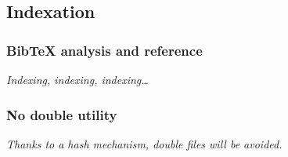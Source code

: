 \subsection{Indexation}

\subsubsection{Bib\TeX{} analysis and reference}

\textit{Indexing, indexing, indexing\ldots}

\subsubsection{No double utility}

\textit{Thanks to a hash mechanism, double files
will be avoided.}

